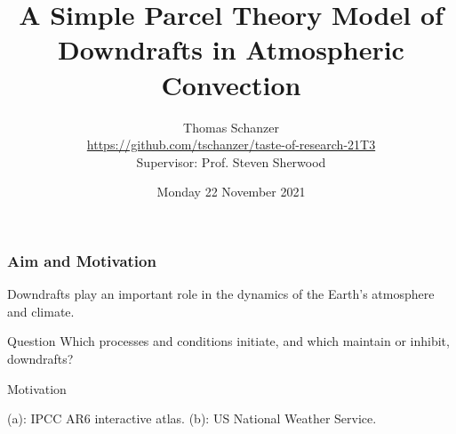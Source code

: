 \documentclass{beamer}
\title{A Simple Parcel Theory Model of Downdrafts in Atmospheric Convection}
\author{
    Thomas Schanzer
    \texorpdfstring{\\}{}
    \small \texorpdfstring{
        \url{https://github.com/tschanzer/taste-of-research-21T3}}{
        https://github.com/tschanzer/taste-of-research-21T3
    }
    \texorpdfstring{\\ \vspace{5mm}}{}
    Supervisor: Prof. Steven Sherwood}
\institute{UNSW School of Physics}
\date{Monday 22 November 2021}
\begin{document}
\frame{\titlepage}

\begin{frame}
    \frametitle{Aim and Motivation}
    Downdrafts play an important role in the dynamics of the Earth's
    atmosphere and climate.
    \begin{block}{Question}
        Which processes and conditions initiate, and which
        maintain or inhibit, downdrafts?
    \end{block}
    \begin{block}{Motivation}
        \vspace{-8mm}
        \begin{figure}[ht]
            \centering
        \end{figure}
        \tiny \color{gray} (a): IPCC AR6 interactive atlas.
        (b): US National Weather Service.
    \end{block}
\end{frame}
\end{document}
